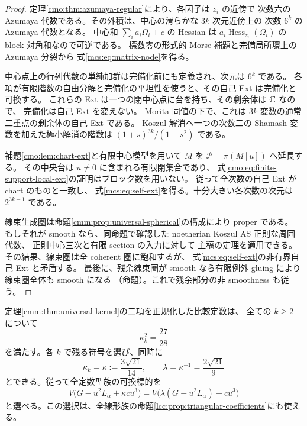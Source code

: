 \begin{proof}
定理\ref{cmo:thm:azumaya-regular}により、各因子は $z_i$ の近傍で
次数六の Azumaya 代数である。その外積は、中心の滑らかな $3k$ 次元近傍上の
次数 $6^k$ の Azumaya 代数となる。
中心和 $\sum_i a_i\Omega_i+c$ の Hessian は
$a_i\operatorname{Hess}_{z_i}(\Omega_i)$ の block 対角和なので可逆である。
標数零の形式的 Morse 補題と完備局所環上の Azumaya 分裂から
式\eqref{mcs:eq:matrix-node}を得る。

中心点上の行列代数の単純加群は完備化前にも定義され、次元は $6^k$ である。
各項が有限階数の自由分解と完備化の平坦性を使うと、その自己 Ext は完備化と可換する。
これらの Ext は一つの閉中心点に台を持ち、その剰余体は $\mathbb C$ なので、
完備化は自己 Ext を変えない。
Morita 同値の下で、これは $3k$ 変数の通常二重点の剰余体の自己 Ext である。
Koszul 解消へ一つの次数二の Shamash 変数を加えた極小解消の階数は
$(1+s)^{3k}/(1-s^2)$ である。

補題\ref{cmo:lem:chart-ext}と有限中心模型を用いて
$M$ を $\mathcal P=\pi(M[u])$ へ延長する。
その中央台は $u\ne0$ に含まれる有限閉集合であり、
式\eqref{cmo:eq:finite-support-local-ext}の証明はブロック数を用いない。
従って全次数の自己 Ext が chart のものと一致し、
式\eqref{mcs:eq:self-ext}を得る。十分大きい各次数の次元は $2^{3k-1}$ である。

線束生成圏は命題\ref{cmm:prop:universal-spherical}の構成により proper である。
もしそれが smooth なら、同命題で確認した noetherian Koszul AS 正則な周囲代数、
正則中心三次と有限 section の入力に対して
主稿の定理を適用できる。
その結果、線束圏は全 coherent 圏に飽和するが、
式\eqref{mcs:eq:self-ext}の非有界自己 Ext と矛盾する。
最後に、残余線束圏が smooth なら有限例外 gluing により線束圏全体も smooth になる
（命題）。これで残余部分の非 smoothness も従う。
\end{proof}

\begin{corollary}[ブロック数に依存しない中心係数の尺度]
\label{mcs:cor:universal-scale}
定理\ref{cmm:thm:universal-kernel}の二項を正規化した比較定数は、
全ての $k\ge2$ について
\begin{equation}\label{mcs:eq:scale}
 \kappa_k^2=\frac{27}{28}
\end{equation}
を満たす。各 $k$ で残る符号を選び、同時に
\[
 \kappa_k=\kappa:=\frac{3\sqrt{21}}{14},\qquad
 \lambda=\kappa^{-1}=\frac{2\sqrt{21}}9
\]
とできる。従って全定数型族の可換標的を
\[
 V\bigl(G-u^2L_\alpha+\kappa cu^3\bigr)
   =V\bigl(\lambda(G-u^2L_\alpha)+cu^3\bigr)
\]
と選べる。この選択は、全線形族の命題\ref{lcc:prop:triangular-coefficients}にも使える。
\end{corollary}

